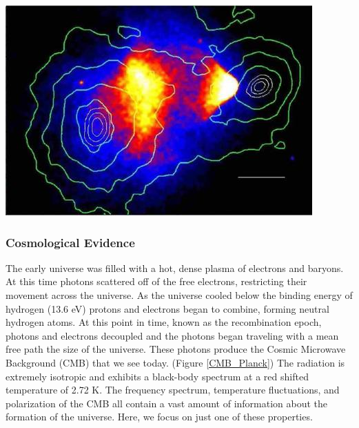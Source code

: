 \documentclass[a4paper,12pt]{article}
\begin{document}
\begin{center} \label{bulletcluster}
\includegraphics[scale=1]{bulletcluster.jpg}
\end{center}
 

\subsubsection{Cosmological Evidence}

The early universe was filled with a hot, dense plasma of electrons and baryons.  At this time photons scattered off of the free electrons, restricting their movement across the universe.  As the universe cooled below the binding energy of hydrogen (13.6 eV) protons and electrons began to combine, forming neutral hydrogen atoms.  At this point in time, known as the recombination epoch,  photons and electrons decoupled and the photons began traveling with a mean free path the size of the universe.  These photons produce the Cosmic Microwave Background (CMB) that we see today. (Figure \ref{CMB_Planck})  The radiation is extremely isotropic and exhibits a black-body spectrum at a red shifted temperature of 2.72 K.  The frequency spectrum, temperature fluctuations, and polarization of the CMB all contain a vast amount of information about the formation of the universe.  Here, we focus on just one of these properties. 
\end{document}
